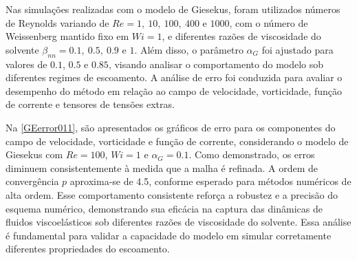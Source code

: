 Nas simulações realizadas com o modelo de Giesekus, foram utilizados números de Reynolds variando de $Re = 1,\ 10,\ 100,\ 400$ e $1000$, com o número de Weissenberg mantido fixo em $Wi = 1$, e diferentes razões de viscosidade do solvente $\beta_{nn} = 0.1,\ 0.5,\ 0.9$ e $1$. Além disso, o parâmetro $\alpha_G$ foi ajustado para valores de $0.1$, $0.5$ e $0.85$, visando analisar o comportamento do modelo sob diferentes regimes de escoamento. A análise de erro foi conduzida para avaliar o desempenho do método em relação ao campo de velocidade, vorticidade, função de corrente e tensores de tensões extras.

Na \autoref{GEerror011}, são apresentados os gráficos de erro para os componentes do campo de velocidade, vorticidade e função de corrente, considerando o modelo de Giesekus com $Re = 100$, $Wi = 1$ e $\alpha_G = 0.1$. Como demonstrado, os erros diminuem consistentemente à medida que a malha é refinada. A ordem de convergência $p$ aproxima-se de 4.5, conforme esperado para métodos numéricos de alta ordem. Esse comportamento consistente reforça a robustez e a precisão do esquema numérico, demonstrando sua eficácia na captura das dinâmicas de fluidos viscoelásticos sob diferentes razões de viscosidade do solvente. Essa análise é fundamental para validar a capacidade do modelo em simular corretamente diferentes propriedades do escoamento.
